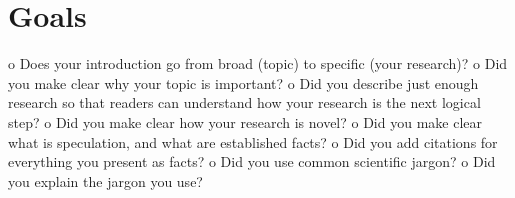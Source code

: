 \section{Goals}
\label{chapter1-goals}

o Does your introduction go from broad (topic) to specific (your research)?
o Did you make clear why your topic is important?
o Did you describe just enough research so that readers can understand how your
research is the next logical step?
o Did you make clear how your research is novel?
o Did you make clear what is speculation, and what are established facts?
o Did you add citations for everything you present as facts?
o Did you use common scientific jargon?
o Did you explain the jargon you use?

